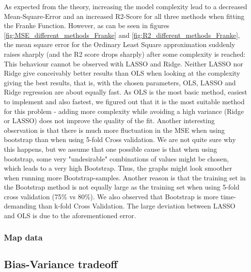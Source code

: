 \documentclass[11pt,a4paper,titlepage]{article}
\begin{document}
As expected from the theory, increasing the model complexity lead to a decreased Mean-Square-Error and an increased R2-Score for all three methods when fitting the Franke Function. However, as can be seen in figures \ref{fig:MSE_different_methods_Franke} and \ref{fig:R2_different_methods_Franke}, the mean square error for the Ordinary Least Square approximation suddenly raises sharply (and the R2 score drops sharply) after some complexity is reached: This behaviour cannot be observed with LASSO and Ridge. Neither LASSO nor Ridge give conceivably better results than OLS when looking at the complexity giving the best results, that is, with the chosen parameters, OLS, LASSO and Ridge regression are about equally fast. As OLS is the most basic method, easiest to implement and also fastest, we figured out that it is the most suitable method for this problem - adding more complexity while avoiding a high variance (Ridge or LASSO) does not improve the quality of the fit.  Another interesting observation is that there is much more fluctuation in the MSE when using bootstrap than when using 5-fold Cross validation. We are not quite sure why this happens, but we assume that one possible cause is that when using bootstrap, some very "undesirable" combinations of values might be chosen, which leads to a very high Bootstrap. Thus, the graphs might look smoother when running more Bootstrap-samples. Another reason is that the training set in the Bootstrap method is not equally large as the training set when using 5-fold cross validation (75\% vs 80\%). We also observed that Bootstrap is more time-demanding than k-fold Cross Validation. The large deviation between LASSO and OLS is due to the aforementioned error.
\subsubsection{Map data}
\subsection{Bias-Variance tradeoff}
\end{document}
